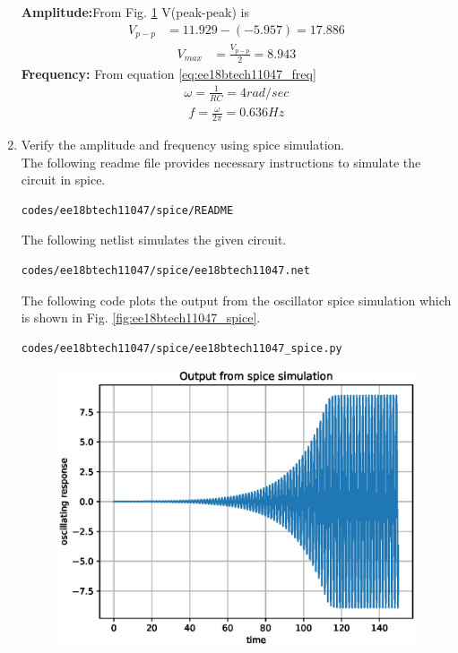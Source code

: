 \begin{enumerate}[label=\arabic*.,ref=\theenumi]
\begin{figure}[!ht]
\caption{}
\label{fig:ee18btech11047_fig8}
\end{figure}
\textbf{Amplitude:}From Fig. \ref{fig:ee18btech11047_fig8} V(peak-peak) is 
\begin{align}
V_{p-p} &= 11.929-(-5.957)= 17.886
\end{align}
\begin{align}
V_{max} &= \frac{V_{p-p}}{2} = 8.943
\end{align}
\textbf{Frequency:} From equation \eqref{eq:ee18btech11047_freq}
\begin{align}
\omega = \frac{1}{RC} = 4 rad/sec
\end{align}
\begin{align}
f = \frac{\omega }{2\pi} = 0.636 Hz
\end{align}
\item Verify the amplitude and frequency using spice simulation.\\
\solution The following readme file provides necessary instructions to simulate the circuit in spice.
\begin{lstlisting}
codes/ee18btech11047/spice/README
\end{lstlisting}
The following netlist simulates the given circuit.
\begin{lstlisting}
codes/ee18btech11047/spice/ee18btech11047.net
\end{lstlisting}
The following code plots the output from the oscillator spice simulation which is shown in Fig. \ref{fig:ee18btech11047_spice}.
\begin{lstlisting}
codes/ee18btech11047/spice/ee18btech11047_spice.py
\end{lstlisting}
\renewcommand{\thefigure}{\theenumi.\arabic{figure}}
%
\begin{figure}[!ht]
\centering
\includegraphics[width=\columnwidth]{./figs/ee18btech11047/ee18btech11047_spice.eps}

\end{figure}
\end{enumerate}
